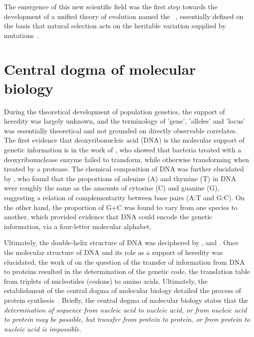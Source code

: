 The emergence of this new scientific field was the first step towards the development of a unified theory of evolution named the ~\citep{huxley1942evolution}, essentially defined on the basis that natural selection acts on the heritable variation supplied by mutations~\citep{mayr1959where,stebbins1966processes,dobzhansky1974chance}.


\section{Central dogma of molecular biology}

During the theoretical development of population genetics, the support of heredity was largely unknown, and the terminology of 'gene', 'alleles' and 'locus' was essentially theoretical and not grounded on directly observable correlates.
The first evidence that deoxyribonucleic acid (\acrshort{DNA}) is the molecular support of genetic information is in the work of \citet{Avery1944}, who showed that bacteria treated with a deoxyribonuclease enzyme failed to transform, while otherwise transforming when treated by a protease.
The chemical composition of \acrshort{DNA} was further elucidated by \citet{Chargaff1950}, who found that the proportions of adenine (A) and thymine (T) in \acrshort{DNA} were roughly the same as the amounts of cytosine (C) and guanine (G), suggesting a relation of complementarity between base pairs (A:T and G:C).
On the other hand, the proportion of G+C was found to vary from one species to another, which provided evidence that \acrshort{DNA} could encode the genetic information, via a four-letter molecular alphabet.

Ultimately, the double-helix structure of \acrshort{DNA} was deciphered by \citet{franklin1953molecular}, \citet{watson1953molecular} and \citet{wilkins1953molecular}.
Once the molecular structure of \acrshort{DNA} and its role as a support of heredity was elucidated, the work of \citet{Crick1958} on the question of the transfer of information from \acrshort{DNA} to proteins resulted in the determination of the genetic code, the translation table from triplets of nucleotides (codons) to amino acids.
Ultimately, the establishment of the central dogma of molecular biology detailed the process of protein synthesis~\citep{Crick1970}.
Briefly, the central dogma of molecular biology states that the \textit{determination of sequence from nucleic acid to nucleic acid, or from nucleic acid to protein may be possible, but transfer from protein to protein, or from protein to nucleic acid is impossible}.


